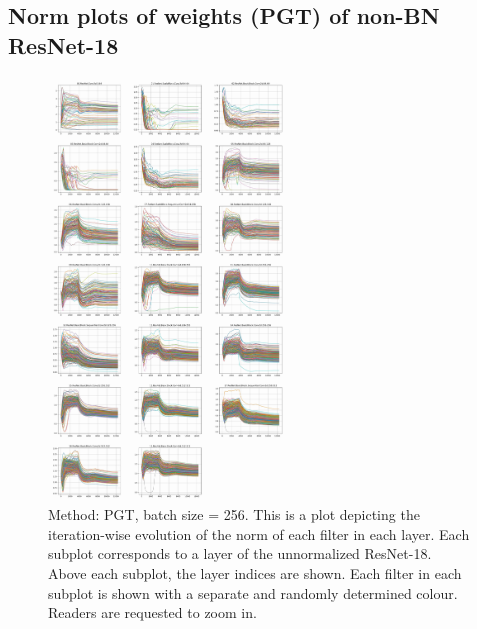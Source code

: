 \documentclass[runningheads]{llncs}
\begin{document}
\subsection{Norm plots of weights (PGT) of non-BN ResNet-18}
\label{sec:plots3}
\begin{figure}[ht]
\centering
\includegraphics[width=0.57\textwidth]{compressed/pgt-w_norm}
\caption{ Method: PGT, batch size = 256. This is a plot depicting the iteration-wise
evolution of the norm of each filter in each layer. Each subplot corresponds to a layer
of the unnormalized ResNet-18. Above each subplot, the layer indices are shown. Each
filter in each subplot is shown with a separate and randomly determined colour. Readers
are requested to zoom in. }
\end{figure}

\clearpage
\end{document}
